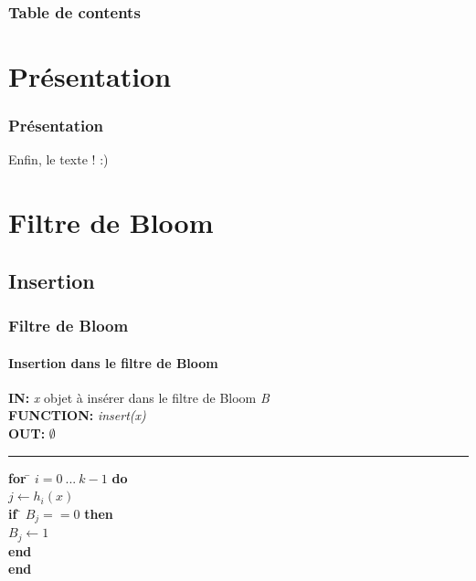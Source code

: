 \documentclass[hyperref={pdfpagemode=FullScreen,colorlinks=true},xcolor=pst,dvips]{beamer}\usepackage[french]{babel}
\title[]{\rule{\linewidth}{1pt}
		\large Recherche de filtres de Bloom similaires \\
		\large Application à la recherche par mots clés basée sur une DHT\\
		\rule{\linewidth}{1pt}
}
\author[NDOMBI TSHISUNGU \& DOAN]{\textbf{NDOMBI TSHISUNGU} Christian \& \textbf{DOAN} Cao Sang \\
			Encadrant: M. \textbf{MAKPANGOU} Mesaac, Regal}
\institute{UPMC}
\date{2 Mai 2015}
\begin{document}
	\begin{frame}
		\titlepage
	\end{frame}
	
	\begin{frame}
		\frametitle{Table de contents}
		\tableofcontents
	\end{frame}
	
	\section{Présentation}
	\begin{frame}
		\frametitle{Présentation}
		Enfin, le texte ! :)
	\end{frame}

	\section{Filtre de Bloom}
	\subsection{Insertion}
	\begin{frame}[shrink]
		\frametitle{Filtre de Bloom}
		\framesubtitle{Insertion dans le filtre de Bloom}
		
		\begin{framed}
		\textbf{IN:} \textit{x} objet à insérer dans le filtre de Bloom \textit{B}\\
		\textbf{FUNCTION:} \textit{insert(x)}\\
		\textbf{OUT:} $\emptyset$
		\noindent\rule{\linewidth}{0.5pt}

		\begin{tabbing}
			\textbf{for} \= $i = 0\ ...\ k - 1$ \textbf{do}\\
					\> $j \leftarrow h_i(x)$\\
					\> \textbf{if} \= $B_j == 0$ \textbf{then}\\
					\> \> $B_j \leftarrow 1$\\
					\> \textbf{end}\\
			\textbf{end}
	    	\end{tabbing}		
	\end{framed}
	\end{frame}
	
\end{document}
